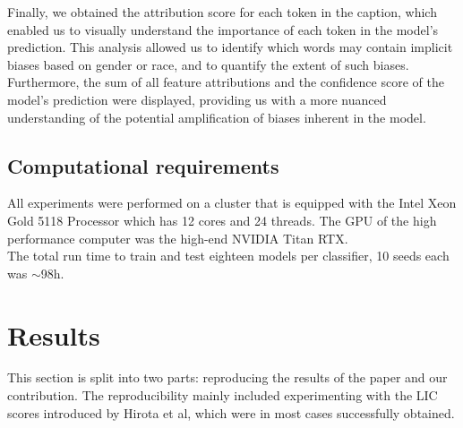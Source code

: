 Finally, we obtained the attribution score for each token in the caption, which enabled us to visually understand the importance of each token in the model's prediction. This analysis allowed us to identify which words may contain implicit biases based on gender or race, and to quantify the extent of such biases. Furthermore, the sum of all feature attributions and the confidence score of the model's prediction were displayed, providing us with a more nuanced understanding of the potential amplification of biases inherent in the model.
\subsection{Computational requirements}

All experiments were performed on a cluster that is equipped with the Intel 
Xeon Gold 5118 Processor which has 12 cores and 24 threads. The GPU of the 
high performance computer was the high-end NVIDIA Titan RTX. \\ 
The total run time to train and test eighteen models per classifier, 10 seeds each was $\sim$98h.


\begin{comment}
Include a description of the hardware used, such as the GPU or CPU the experiments were run on. 
For each model, include a measure of the average runtime (e.g. average time to predict labels for a given validation set with a particular batch size).
For each experiment, include the total computational requirements (e.g. the total GPU hours spent).
(Note: you'll likely have to record this as you run your experiments, so it's better to think about it ahead of time). Generally, consider the perspective of a reader who wants to use the approach described in the paper --- list what they would find useful.
\end{comment}

\section{Results}
\label{sec:results}

\begin{comment}
    Start with a high-level overview of your results. Do your results support the main claims of the original paper? Keep this section as factual and precise as possible, reserve your judgement and discussion points for the next "Discussion" section.
\end{comment}

This section is split into two parts: reproducing the results of the paper and 
our contribution. The reproducibility mainly included experimenting with the LIC scores 
introduced by Hirota et al, which were in most cases successfully obtained. \newline

